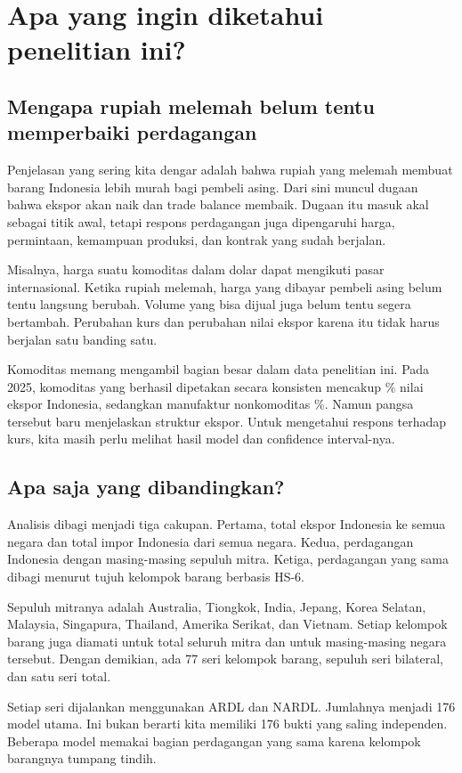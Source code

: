 \section{Apa yang ingin diketahui penelitian ini?}\label{sec:intro}
\subsection{Mengapa rupiah melemah belum tentu memperbaiki perdagangan}
Penjelasan yang sering kita dengar adalah bahwa rupiah yang melemah membuat barang Indonesia lebih murah bagi pembeli asing. Dari sini muncul dugaan bahwa ekspor akan naik dan trade balance membaik. Dugaan itu masuk akal sebagai titik awal, tetapi respons perdagangan juga dipengaruhi harga, permintaan, kemampuan produksi, dan kontrak yang sudah berjalan.

Misalnya, harga suatu komoditas dalam dolar dapat mengikuti pasar internasional. Ketika rupiah melemah, harga yang dibayar pembeli asing belum tentu langsung berubah. Volume yang bisa dijual juga belum tentu segera bertambah. Perubahan kurs dan perubahan nilai ekspor karena itu tidak harus berjalan satu banding satu.

Komoditas memang mengambil bagian besar dalam data penelitian ini. Pada 2025, komoditas yang berhasil dipetakan secara konsisten mencakup \CommodityShare\% nilai ekspor Indonesia, sedangkan manufaktur nonkomoditas \ManufacturingShare\%. Namun pangsa tersebut baru menjelaskan struktur ekspor. Untuk mengetahui respons terhadap kurs, kita masih perlu melihat hasil model dan confidence interval-nya.

\subsection{Apa saja yang dibandingkan?}
Analisis dibagi menjadi tiga cakupan. Pertama, total ekspor Indonesia ke semua negara dan total impor Indonesia dari semua negara. Kedua, perdagangan Indonesia dengan masing-masing sepuluh mitra. Ketiga, perdagangan yang sama dibagi menurut tujuh kelompok barang berbasis HS-6.

Sepuluh mitranya adalah Australia, Tiongkok, India, Jepang, Korea Selatan, Malaysia, Singapura, Thailand, Amerika Serikat, dan Vietnam. Setiap kelompok barang juga diamati untuk total seluruh mitra dan untuk masing-masing negara tersebut. Dengan demikian, ada 77 seri kelompok barang, sepuluh seri bilateral, dan satu seri total.

Setiap seri dijalankan menggunakan ARDL dan NARDL. Jumlahnya menjadi 176 model utama. Ini bukan berarti kita memiliki 176 bukti yang saling independen. Beberapa model memakai bagian perdagangan yang sama karena kelompok barangnya tumpang tindih.

